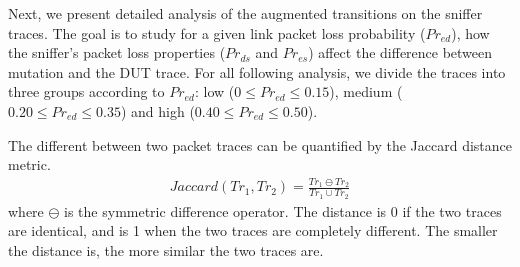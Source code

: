 Next, we present detailed analysis of the augmented transitions on the sniffer
traces. The goal is to study for a given link packet loss probability
($Pr_{ed}$), how the sniffer's packet loss properties ($Pr_{ds}$ and $Pr_{es}$)
affect the difference between mutation and the DUT trace.   For all following
analysis, we divide the traces into three groups according to $Pr_{ed}$: low ($0
\le Pr_{ed} \le 0.15$), medium ($0.20 \le Pr_{ed} \le 0.35$) and high ($0.40 \le
Pr_{ed} \le 0.50$).

The different between two packet traces can be quantified by the Jaccard distance
metric.%
\begin{align}
  Jaccard(Tr_1, Tr_2) = \frac{Tr_1 \ominus Tr_2}{Tr_1 \cup Tr_2}
\end{align}%
where $\ominus$ is the symmetric difference operator.
The distance is 0 if the
two traces are identical, and is 1 when the two traces are completely different.
The smaller the distance is, the more similar the two traces are.

